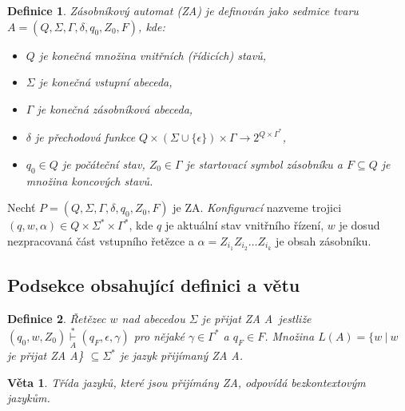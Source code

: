 \documentclass[a4paper, twocolumn, 11pt]{article}
\newtheorem{definice}{Definice}
\newtheorem{veta}{Věta}
\begin{document}
\label{definicia}
\begin{definice}
\emph{Zásobníkový automat} (ZA) je definován jako sedmice tvaru $A =(Q,\Sigma,\Gamma,\delta,q_0,Z_0,F)$, kde: 
\begin{itemize}
        \item $Q$ je konečná množina \emph{vnitřních (řídicích) stavů}, 
        \item $\Sigma$ je konečná \emph{vstupní abeceda}, 
        \item $\Gamma$ je konečná \emph{zásobníková abeceda}, 
        \item $\delta$ je \emph{přechodová funkce} $Q \times (\Sigma \cup \{\epsilon\}) \times \Gamma \rightarrow 2^{Q \times \Gamma^*}$,
        \item $q_0 \in Q$ je \emph{počáteční stav}, $Z_0 \in \Gamma$ je \emph{startovací symbol zásobníku }a $F \subseteq Q$ je množina \emph{koncových stavů.} 
\end{itemize}
\end{definice}

Nechť $P =(Q,\Sigma,\Gamma,\delta,q_0,Z_0,F)$ je ZA. \emph{Konfigurací} nazveme trojici $(q, w, \alpha) \in Q \times \Sigma^* \times \Gamma^*$, kde $q$ je aktuální stav vnitřního řízení, $w$ je dosud nezpracovaná část vstupního řetězce a $\alpha = Z_{i_1}Z_{i_2} \dots Z_{i_k}$ je obsah zásobníku.

\subsection{Podsekce obsahující definici a větu}
\begin{definice}
\emph{Řetězec} $w$ \emph{nad abecedou} $\Sigma$ \emph{je přijat ZA} A~jestliže $(q_0, w, Z_0) \overset{\ast}{\underset{A}{\vdash}} (q_F,\epsilon, \gamma)$ pro nějaké $\gamma \in \Gamma^*$ a $q_F \in F$. Množina $L(A) = \{w\ |\ w $ je přijat ZA A\} $\subseteq \Sigma^*$ je \emph{jazyk přijímaný ZA} A.
\end{definice}
\begin{veta}
Třída jazyků, které jsou přijímány ZA, odpovídá \emph{bezkontextovým jazykům}.
\end{veta}
\end{document}
